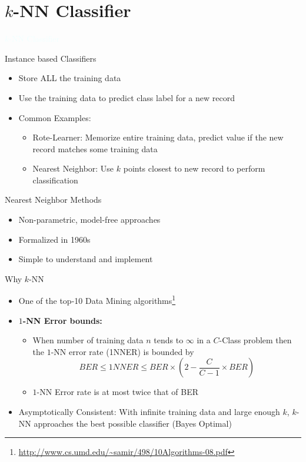 \documentclass{beamer}
\newcommand{\thblue}[1]{{\Huge {\textcolor{azure}{#1}}}}
\newcommand{\furl}[1]{{\footnote{\url{#1}}}}
\begin{document}
\section{$k$-NN Classifier}
\begin{frame}{} 
    \begin{center}
        \thblue{$k$-NN Classifier}
    \end{center}
\end{frame}

\begin{frame}{Instance based Classifiers}
    \begin{itemize}
        \item Store ALL the training data 
        \item Use the training data to predict class label for a new record
        \item Common Examples:
        \begin{itemize}
            \item Rote-Learner: Memorize entire training data, predict value if the new record matches some training data
            \item Nearest Neighbor: Use $k$ points closest to new record to perform classification
        \end{itemize}
    \end{itemize}
\end{frame}


\begin{frame}{Nearest Neighbor Methods}
    \begin{itemize}
        \item Non-parametric, model-free approaches
        \item Formalized in 1960s
        \item Simple to understand and implement
    \end{itemize}
\end{frame}


\begin{frame}{Why $k$-NN}
    \begin{itemize}
        \item One of the top-10 Data Mining algorithms\furl{http://www.cs.umd.edu/~samir/498/10Algorithms-08.pdf}
        \item {\bf $1$-NN Error bounds:} 
        \begin{itemize}
            \item When number of training data $n$ tends to $\infty$ in a $C$-Class problem then the $1$-NN error rate (1NNER) 
                is bounded by $$BER \leq 1NNER \leq BER \times \left( 2 - \frac{C}{C-1} \times BER \right)$$
            \item $1$-NN Error rate is at most twice that of BER
        \end{itemize}
        \item Asymptotically Consistent: With infinite training data and large enough $k$, $k$-NN approaches the best possible classifier (Bayes Optimal)
    \end{itemize}
\end{frame}
\end{document}
